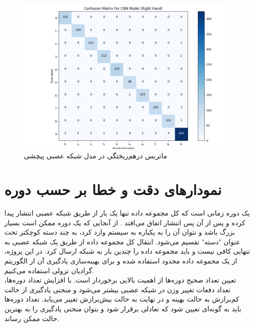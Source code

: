 

\begin{figure}[h]
    \centering
    \includegraphics[width=1\textwidth]{Matrix_CNN_right.png}
    \caption{ ماتریس درهم‌ریختگی در مدل شبکه عصبی پیچشی}
    \label{matrix}
\end{figure}






\section[نمودار‌های دقت و خطا بر حسب دوره]{ نمودار‌های دقت و خطا بر حسب دوره }
یک دوره زمانی است که کل مجموعه داده تنها یک بار از طریق شبکه عصبی انتشار پیدا کرده و پس از آن پس انتشار اتفاق می‌افتد
. از آنجایی که یک دوره ممکن است بسیار بزرگ باشد و نتوان آن را به یکباره به سیستم وارد کرد، به چند دسته کوچکتر تحت عنوان "دسته" تقسیم می‌شود. انتقال کل مجموعه داده از طریق یک شبکه عصبی به تنهایی کافی نیست و باید مجموعه داده را چندین بار به شبکه ارسال کرد. در این پروژه، از یک مجموعه داده محدود استفاده شده و برای بهینه‌سازی یادگیری آن از الگوریتم گرادیان نزولی استفاده می‌کنیم.
\\
تعیین تعداد صحیح دوره‌ها از اهمیت بالایی برخوردار است. با افزایش تعداد دوره‌ها،‌ تعداد دفعات تغییر وزن در شبکه عصبی بیشتر می‌شود و منحنی یادگیری از حالت کم‌برازش به حالت بهینه و در نهایت به حالت بیش‌برازش تغییر می‌یابد. تعداد دوره‌ها باید به گونه‌ای تعیین شود که تعادلی برقرار شود و بتوان منحنی یادگیری را به بهترین حالت ممکن رساند.\\



